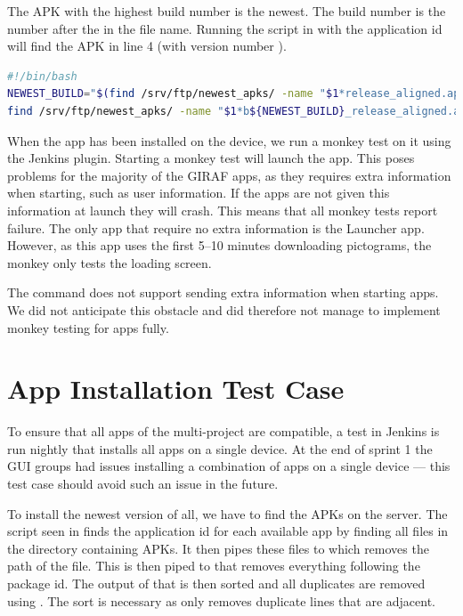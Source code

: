 The APK with the highest build number is the newest. The build number is the number after the  in the file name. Running the script in  with the application id  will find the APK in line 4 (with version number ).

\begin{lstlisting}[float=tbp,language=bash,showstringspaces=false,caption=Bash script that finds the newest APK for a particular application id,label=lst:find_newest_apk]
#!/bin/bash
NEWEST_BUILD="$(find /srv/ftp/newest_apks/ -name "$1*release_aligned.apk" | sed 's/.*b//' | sed 's/_release_aligned.apk//' | awk '$0>x{x=$0};END{print x}')"
find /srv/ftp/newest_apks/ -name "$1*b${NEWEST_BUILD}_release_aligned.apk"
\end{lstlisting}

When the app has been installed on the device, we run a monkey test on it using the Jenkins plugin. Starting a monkey test will launch the app. This poses problems for the majority of the GIRAF apps, as they requires extra information when starting, such as user information. If the apps are not given this information at launch they will crash. This means that all monkey tests report failure. The only app that require no extra information is the Launcher app. However, as this app uses the first 5--10 minutes downloading pictograms, the monkey only tests the loading screen.

The  command does not support sending extra information when starting apps. We did not anticipate this obstacle and did therefore not manage to implement monkey testing for apps fully.


\section{App Installation Test Case}\label{sec:s3_appinstallationtest}
To ensure that all apps of the multi-project are compatible, a test in Jenkins is run nightly that installs all apps on a single device. At the end of sprint 1 the GUI groups had issues installing a combination of apps on a single device --- this test case should avoid such an issue in the future.

To install the newest version of all, we have to find the APKs on the server. The script seen in  finds the application id for each available app by finding all files in the directory containing APKs. It then pipes these files to  which removes the path of the file. This is then piped to  that removes everything following the package id. The output of that is then sorted and all duplicates are removed using . The sort is necessary as  only removes duplicate lines that are adjacent.

